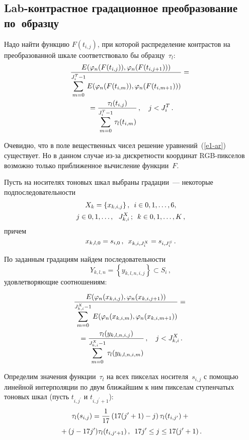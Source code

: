\begin{multicols}{2}
\section{Lab-контрастное градационное преобразование по~образцу}

  Надо найти функцию $F(t_{i,j})$, при которой распределение контрастов на 
преобразованной шкале соответствовало бы образцу~$\tau_l$:
  \begin{multline}
  \displaystyle\frac{\displaystyle E(\varphi_n(F(t_{i,j})), \varphi_n(F(t_{i,j+1})))\mathstrut}{\displaystyle \sum\limits_{m=0}^{J_i^T-1}E(\varphi_n(F(t_{i,m})),\varphi_n(F(t_{i,m+1})))\mathstrut} = {}\\
{}=
\displaystyle\frac{\displaystyle \tau_l(t_{i,j})\mathstrut}{\displaystyle \sum\limits_{m=0}^{J_i^T-1}\tau_l(t_{i,m})\mathstrut}\,,\quad j<J_i^T\,.
  \label{e1-ar}
  \end{multline}
  
  Очевидно, что в поле вещественных чисел решение уравнений~(\ref{e1-ar}) 
существует. Но в данном случае из-за дискретности координат 
  RGB-пик\-се\-лов возможно только приближенное вычисление функции~$F$. 
  
  Пусть на носителях тоновых шкал выбраны градации~--- некоторые 
подпоследовательности
  \begin{multline*}
  X_k=\{x_{k,i,j}\}\,, \enskip i\in 0,1,\ldots, 6,\\ 
  j\in 0,1,\ldots ,\ \   J_{k,i}^X\,;\enskip  k\in  0,1,\ldots , K\,,
  \end{multline*}
причем
$$
x_{k,l,0} =s_{i,0}\,,\enskip  x_{k,i,J_i^X}=s_{i,J_i^S}\,.
$$
  
  По заданным градациям найдем последовательности 
  $$
  Y_{k,l,n} =\left\{ y_{k,l,n,i,j}\right\} \subset S_i\,,
  $$
удовлетворяющие соотношениям: 

\noindent
\begin{multline}
\displaystyle\frac{\displaystyle E(\varphi_n(x_{k,i,j}),\varphi_n(x_{k,i,j+1}))\mathstrut}{\displaystyle \sum\limits_{m=0}^{J^X_{k,i}-1} 
E(\varphi_n(x_{k,i,m}),\varphi_n(x_{k,i,m+1}))\mathstrut}={}\\
{}=
\displaystyle\frac{\displaystyle \tau_l(y_{k,l,n,i,j})\mathstrut}{\displaystyle \sum\limits_{m=0}^{J_{k,i}^X-1} \tau_l 
(y_{k,l,n,i,m})\mathstrut}\,,\quad j<J^X_{k,i}\,.
\label{e2-ar}
\end{multline}
  
  Определим значения функции~$\tau_l$ на всех пикселах носителя~$s_{i,j}$ с 
помощью линейной интерполяции по двум ближайшим к ним пикселам 
ступенчатых тоновых шкал (пусть $t_{i,j^\prime}$ и $t_{i,j^\prime+1}$):
\begin{multline*}
  \tau_l(s_{i,j}) =\displaystyle\frac{\displaystyle 1\mathstrut}{\displaystyle 17\mathstrut}\left( 17(j^\prime+1)-j\right) \tau_l(t_{i,j^\prime})+{}\\
  {}+
  (j-17j^\prime)\tau_l (t_{i,j^\prime+1})\,,\enskip
  17j^\prime\leq j\leq 17(j^\prime+1)\,.
  \end{multline*}
  

\end{multicols}
